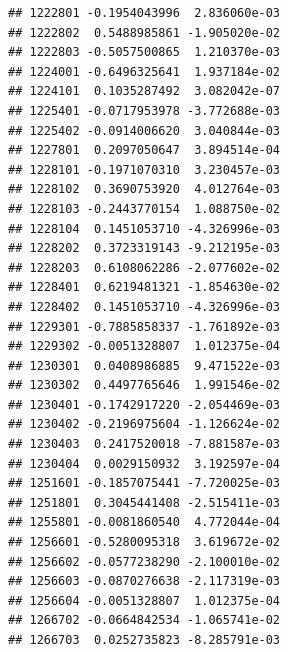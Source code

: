\documentclass[ignorenonframetext,]{beamer}
\begin{document}
\begin{frame}[fragile]
\begin{verbatim}
## 1222801 -0.1954043996  2.836060e-03
## 1222802  0.5488985861 -1.905020e-02
## 1222803 -0.5057500865  1.210370e-03
## 1224001 -0.6496325641  1.937184e-02
## 1224101  0.1035287492  3.082042e-07
## 1225401 -0.0717953978 -3.772688e-03
## 1225402 -0.0914006620  3.040844e-03
## 1227801  0.2097050647  3.894514e-04
## 1228101 -0.1971070310  3.230457e-03
## 1228102  0.3690753920  4.012764e-03
## 1228103 -0.2443770154  1.088750e-02
## 1228104  0.1451053710 -4.326996e-03
## 1228202  0.3723319143 -9.212195e-03
## 1228203  0.6108062286 -2.077602e-02
## 1228401  0.6219481321 -1.854630e-02
## 1228402  0.1451053710 -4.326996e-03
## 1229301 -0.7885858337 -1.761892e-03
## 1229302 -0.0051328807  1.012375e-04
## 1230301  0.0408986885  9.471522e-03
## 1230302  0.4497765646  1.991546e-02
## 1230401 -0.1742917220 -2.054469e-03
## 1230402 -0.2196975604 -1.126624e-02
## 1230403  0.2417520018 -7.881587e-03
## 1230404  0.0029150932  3.192597e-04
## 1251601 -0.1857075441 -7.720025e-03
## 1251801  0.3045441408 -2.515411e-03
## 1255801 -0.0081860540  4.772044e-04
## 1256601 -0.5280095318  3.619672e-02
## 1256602 -0.0577238290 -2.100010e-02
## 1256603 -0.0870276638 -2.117319e-03
## 1256604 -0.0051328807  1.012375e-04
## 1266702 -0.0664842534 -1.065741e-02
## 1266703  0.0252735823 -8.285791e-03
\end{verbatim}

\end{frame}
\end{document}
